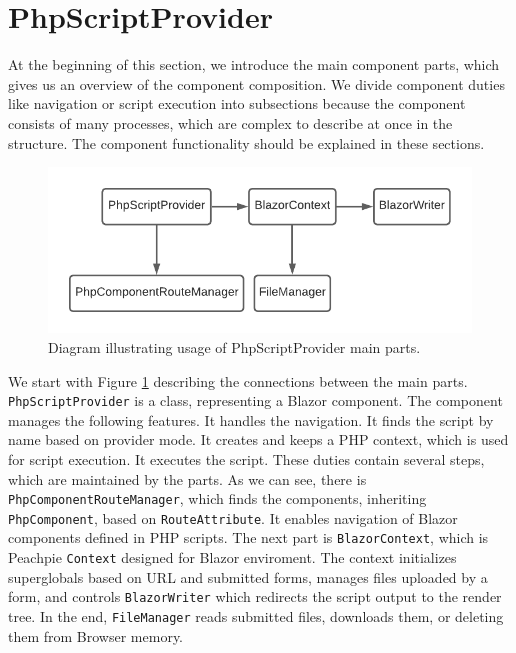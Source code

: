 \section{PhpScriptProvider}

At the beginning of this section, we introduce the main component parts, which gives us an overview of the component composition.
We divide component duties like navigation or script execution into subsections because the component consists of many processes, which are complex to describe at once in the structure.
The component functionality should be explained in these sections.
\par
\begin{figure}[b]\centering
\includegraphics[scale=0.8]{./img/PhpScriptProvider}
\caption{Diagram illustrating usage of PhpScriptProvider main parts.}
\label{img18:provider}
\end{figure}
\par
We start with Figure \ref{img18:provider} describing the connections between the main parts.
\texttt{PhpScriptProvider} is a class, representing a Blazor component.
The component manages the following features.
It handles the navigation.
It finds the script by name based on provider mode.
It creates and keeps a PHP context, which is used for script execution.
It executes the script.
These duties contain several steps, which are maintained by the parts.
As we can see, there is \texttt{PhpComponentRouteManager}, which finds the components, inheriting \texttt{PhpComponent}, based on \texttt{RouteAttribute}.
It enables navigation of Blazor components defined in PHP scripts.
The next part is \texttt{BlazorContext}, which is Peachpie \texttt{Context} designed for Blazor enviroment.
The context initializes superglobals based on URL and submitted forms, manages files uploaded by a form, and controls  \texttt{BlazorWriter} which redirects the script output to the render tree.
In the end, \texttt{FileManager} reads submitted files, downloads them, or deleting them from Browser memory.
\par
